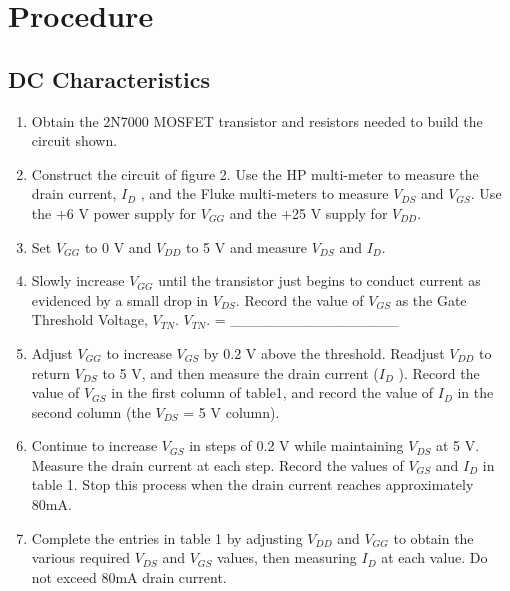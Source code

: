 
\section{Procedure}
\label{sec:procedure}

\subsection{DC Characteristics}
\label{sec:inverter}

\begin{enumerate}
\item Obtain the 2N7000 MOSFET transistor and resistors needed to build the circuit shown.
\item Construct the circuit of figure 2. Use the HP multi-meter to measure the drain current, $I_D$ , and the Fluke multi-meters to measure $V_{DS}$ and $V_{GS}$. Use the +6 V power supply for $V_{GG}$ and the +25 V supply for $V_{DD}$.
\item Set $V_{GG}$ to 0 V and $V_{DD}$ to 5 V and measure $V_{DS}$ and $I_D$.
\item Slowly increase $V_{GG}$ until the transistor just begins to conduct current as evidenced by a small drop in $V_{DS}$. Record the value of $V_{GS}$ as the Gate Threshold Voltage, $V_{TN}$. $V_{TN}$. = ________________
\item Adjust $V_{GG}$ to increase $V_{GS}$ by 0.2 V above the threshold. Readjust $V_{DD}$ to return $V_{DS}$ to 5 V, and then measure the drain current ($I_D$ ). Record the value of $V_{GS}$ in the first column of table1, and record the value of $I_D$ in the second column (the $V_{DS}$ = 5 V column).
\item Continue to increase $V_{GS}$ in steps of 0.2 V while maintaining $V_{DS}$ at 5 V. Measure the drain current at each step. Record the values of $V_{GS}$ and $I_D$ in table 1. Stop this process when the drain current reaches approximately 80mA.
\item Complete the entries in table 1 by adjusting $V_{DD}$ and $V_{GG}$ to obtain the various required $V_{DS}$ and $V_{GS}$ values, then measuring $I_D$ at each value. Do not exceed 80mA drain current.
\end{enumerate}

